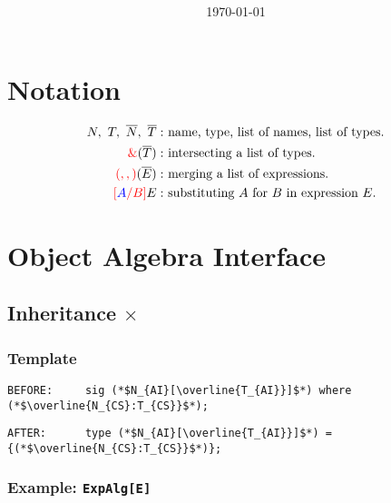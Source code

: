 \documentclass{article}
\title{\huge\textmd{\bf\thistitle}}
\date{}
\author{\today}
\newcommand{\red}[1]{\textcolor{red}{#1}}
\newcommand{\blue}[1]{\textcolor{blue}{#1}}
\begin{document}
\begin{spacing}{1.1}
\maketitle \thispagestyle{empty}


\section*{Notation}

\begin{align*}
N,\ T,\ \overline{N},\ \overline{T}:&\textrm{ name, type, list of names, list of types.}\\
\red{\&}(\overline{T}):&\textrm{ intersecting a list of types.}\\
\red{(,,)}(\overline{E}):&\textrm{ merging a list of expressions.}\\
\red{[}\blue{A}\red{/B]}E:&\textrm{ substituting }A\textrm{ for }B\textrm{ in expression }E.
\end{align*}

\section{Object Algebra Interface}

\subsection{Inheritance $\times$}

\subsubsection{Template}

\begin{lstlisting}[numbers=none]
BEFORE:     sig (*$N_{AI}[\overline{T_{AI}}]$*) where (*$\overline{N_{CS}:T_{CS}}$*);
\end{lstlisting}
\begin{lstlisting}[numbers=none]
AFTER:      type (*$N_{AI}[\overline{T_{AI}}]$*) = {(*$\overline{N_{CS}:T_{CS}}$*)};
\end{lstlisting}

\subsubsection{Example: \lstinline{ExpAlg[E]}}


\end{spacing}
\end{document}
